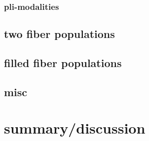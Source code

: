 \subsubsection{pli-modalities}
% 
% 
% 
% 
\subsection{two fiber populations}
\subsection{filled fiber populations}
\subsection{misc}
\section{summary/discussion}
% 
% 
% 
